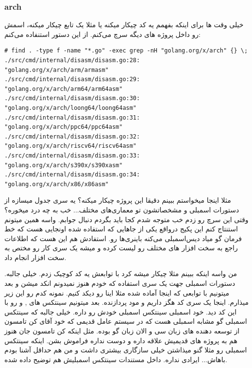 \subsubsection{arch}
خیلی وقت ها برای اینکه بفهمم یه کد چیکار میکنه یا مثلا یک تابع چیکار میکنه، اسمش رو داخل پروژه های دیگه سرچ می‌کنم.
از این دستور استنفاده می‌کنم:

\begin{latin}
\begin{verbatim}
# find . -type f -name "*.go" -exec grep -nH "golang.org/x/arch" {} \;
./src/cmd/internal/disasm/disasm.go:28:       "golang.org/x/arch/arm/armasm"
./src/cmd/internal/disasm/disasm.go:29:       "golang.org/x/arch/arm64/arm64asm"
./src/cmd/internal/disasm/disasm.go:30:       "golang.org/x/arch/loong64/loong64asm"
./src/cmd/internal/disasm/disasm.go:31:       "golang.org/x/arch/ppc64/ppc64asm"
./src/cmd/internal/disasm/disasm.go:32:       "golang.org/x/arch/riscv64/riscv64asm"
./src/cmd/internal/disasm/disasm.go:33:       "golang.org/x/arch/s390x/s390xasm"
./src/cmd/internal/disasm/disasm.go:34:       "golang.org/x/arch/x86/x86asm"
\end{verbatim}
\end{latin}
مثلا اینجا میخواستم ببینم دقیقا این پروژه  چیکار میکنه؟ یه سری جدول میسازه از دستورات اسمبلی و مشخصاتشون تو معماری‌های
مختلف... خب به چه درد میخوره؟ وقتی این سرچ رو زدم خب متوجه شدم کجا باید بگردم دنبال جوابم. 
واسه همین میتونم استنتاج کنم این پکیج درواقع یکی از جاهایی که استفاده شده اونجایی هست که خط فرمان گو میاد دیس‌اسمبلی می‌کنه باینری‌ها رو.
استفادش هم این هست که اطلاعات راجع به سخت افزار های مختلف رو لیست کرده و میشه یک سری کار رو مختص به سخت افزار انجام داد.

من واسه اینکه ببینم مثلا چیکار میشه کرد با توابعش یه کد کوچیک زدم. خیلی جالبه. دستورات اسمبلی جهت یک سری استفاده که خودم هنوز نمیدونم
انکد میشن و بعد میتونیم با توابعی که اینجا آماده شده مثلا اینا رو دیکد کنیم. نمونه کدم رو این زیر میذارم. اینجا یک سری کد هگز داریم و مود پردازنده.
بعد میتونیم سینتکس های ,  و  رو با این کد دید. خود اسمبلی سینتکس اسمبلی خودش رو داره. خیلی جالبه که سینتکس اسمبلی
گو مشابه اسمبلی هست که در  سیستم عامل قدیمی که خود آقای کن تامسون از توسعه دهنده های زبان سی و الان زبان گو بوده.
مثل اینکه کن تامسون جان هنوز هم به پروژه های قدیمیش علاقه داره و دوست نداره فراموش بشن. اینکه سینتکس اسمبلی رو مثلا گنو میذاشتن خیلی
سازگاری بیشتری داشت و من هم حداقل آشنا بودم باهاش... ایرادی نداره. داخل مستندات  سینتکس اسمبلیش هم توضیح داده شده.

